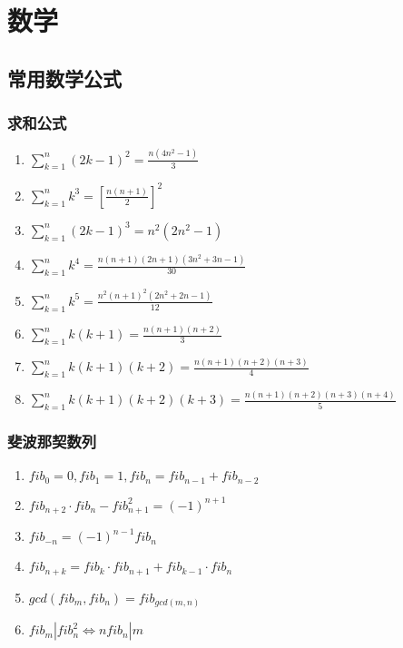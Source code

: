 \documentclass[landscape,twocolumn,a4paper]{article}
\begin{document}

\section{数学}


\subsection{常用数学公式}

\subsubsection{求和公式}

\begin{enumerate}
	\item $\sum_{k=1}^{n}(2k-1)^2 = \frac{n(4n^2-1)}{3}	$
	\item $\sum_{k=1}^{n}k^3 = [\frac{n(n+1)}{2}]^2	$
	\item $\sum_{k=1}^{n}(2k-1)^3 = n^2(2n^2-1)	$
	\item $\sum_{k=1}^{n}k^4 = \frac{n(n+1)(2n+1)(3n^2+3n-1)}{30}  $
	\item $\sum_{k=1}^{n}k^5 = \frac{n^2(n+1)^2(2n^2+2n-1)}{12}	$
	\item $\sum_{k=1}^{n}k(k+1) = \frac{n(n+1)(n+2)}{3}	$
	\item $\sum_{k=1}^{n}k(k+1)(k+2) = \frac{n(n+1)(n+2)(n+3)}{4} $
	\item $\sum_{k=1}^{n}k(k+1)(k+2)(k+3) = \frac{n(n+1)(n+2)(n+3)(n+4)}{5} $
\end{enumerate}

\subsubsection{斐波那契数列}

\begin{enumerate}
	\item $fib_0=0, fib_1=1, fib_n=fib_{n-1}+fib_{n-2}$
	\item $fib_{n+2} \cdot fib_n-fib_{n+1}^2=(-1)^{n+1}$
	\item $fib_{-n}=(-1)^{n-1}fib_n$
	\item $fib_{n+k}=fib_k \cdot fib_{n+1}+fib_{k-1} \cdot fib_n$
	\item $gcd(fib_m, fib_n)=fib_{gcd(m, n)}$
	\item $fib_m|fib_n^2\Leftrightarrow nfib_n|m$
\end{enumerate}
\end{document}
